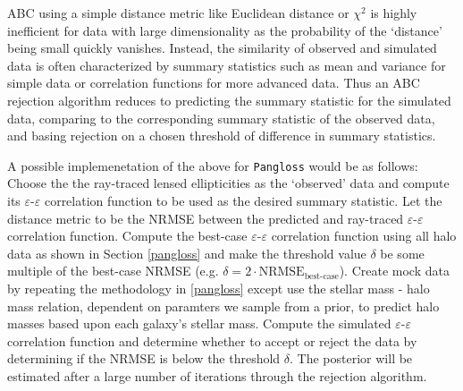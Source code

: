 \documentclass[%
 reprint,
 amsmath,amssymb,
 aps,nofootinbib
]{revtex4-1}
\begin{document}
ABC using a simple distance metric like Euclidean distance or $\chi^2$ is highly inefficient for data with large dimensionality as the probability of the `distance' being small quickly vanishes. Instead, the similarity of observed and simulated data is often characterized by summary statistics such as mean and variance for simple data or correlation functions for more advanced data. Thus an ABC rejection algorithm reduces to predicting the summary statistic for the simulated data, comparing to the corresponding summary statistic of the observed data, and basing rejection on a chosen threshold of difference in summary statistics.

A possible implemenetation of the above for \texttt{Pangloss} would be as follows: Choose the the ray-traced lensed ellipticities as the `observed' data and compute its $\varepsilon$-$\varepsilon$ correlation function to be used as the desired summary statistic. Let the distance metric to be the NRMSE between the predicted and ray-traced $\varepsilon$-$\varepsilon$ correlation function. Compute the best-case $\varepsilon$-$\varepsilon$ correlation function using all halo data as shown in Section \ref{pangloss} and make the threshold value $\delta$ be some multiple of the best-case NRMSE (e.g. ${\delta=2\cdot\text{NRMSE}_{\text{best-case}}}$). Create mock data by repeating the methodology in \ref{pangloss} except use the stellar mass - halo mass relation, dependent on paramters we sample from a prior, to predict halo masses based upon each galaxy's stellar mass. Compute the simulated $\varepsilon$-$\varepsilon$ correlation function and determine whether to accept or reject the data by determining if the NRMSE is below the threshold $\delta$. The posterior will be estimated after a large number of iterations through the rejection algorithm.

\end{document}
